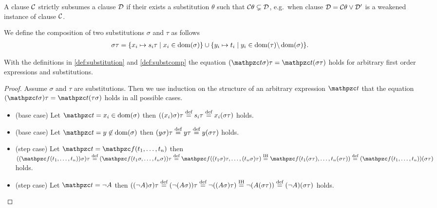 \begin{definition}
	A clause $\mcC$ {\myem strictly subsumes} a clause $\mcD$ if their exists a substitution $\theta$ such that $\mcC\theta \subsetneq \mcD$,
	e.g.~when clause $\mcD = \mcC\theta \lor \mcD'$ is a weakened instance of clause $\mcC$.
\end{definition}

\begin{definition}\label{def:substcomp}
We define the {\myem composition} of two substitutions $\sigma$ and $\tau$ as follows
	\begin{align*}
		\sigma\tau&=\{ x_i\mapsto s_i\tau\mid x_i\in\domain(\sigma) \}
		\cup
		\{ y_i\mapsto t_i\mid y_i\in\domain(\tau) \backslash \domain(\sigma) \}.
	\end{align*}
\end{definition}

\begin{lemma}\label{lem:substitution}
	With the definitions in \ref{def:substitution} and \ref{def:substcomp} the equation
	$(\mct\sigma)\tau = \mct(\sigma\tau)$ holds for
	arbitrary first order expressions and substitutions.
\end{lemma}

\begin{proof}
	Assume $\sigma$ and $\tau$ are substitutions. 
	Then we use induction on the structure of an arbitrary expression $\mct$
	that the equation $(\mct\sigma)\tau =  \mct(\tau\sigma)$ holds in all possible cases.
	\begin{itemize}
		\item (base case) Let $\mct = x_i \in\domain(\sigma)$ then
		$((x_i)\sigma)\tau\defEQ s_i\tau\defEQ x_i(\sigma\tau)$ holds.
		
		\item (base case) Let $\mct = y \not\in\domain(\sigma)$ then
		$(y\sigma)\tau \defEQ y\tau \defEQ y(\sigma\tau)$ holds. 
		
		\item (step case) Let $\mct = \mcf(t_1,\ldots,t_n)$ 
		then
		$((\mcf(t_1,\ldots,t_n))\sigma)\tau
		\defEQ 
		(\mcf(t_1\sigma,\ldots,t_n\sigma))\tau
		\defEQ 
		\mcf((t_1\sigma)\tau,\ldots,(t_n\sigma)\tau)
		\defEQ[IH]
		\mcf(t_1(\sigma\tau),\ldots,t_n(\sigma\tau))
		\defEQ
		(\mcf(t_1,\ldots,t_n))(\sigma\tau)
		$ holds.
		
		\item (step case) Let $\mct = \lnot A$ then
		$((\lnot A)\sigma)\tau 
		\defEQ 
		(\lnot(A\sigma))\tau 
		\defEQ 
		\lnot((A\sigma)\tau)
		\defEQ[IH]
		\lnot(A(\sigma\tau))
		\defEQ 
		(\lnot A)(\sigma\tau)
		$ holds.
	\end{itemize}
\end{proof}
